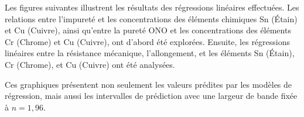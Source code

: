 \documentclass[12pt]{article}
\begin{document}
Les figures suivantes illustrent les résultats des régressions linéaires 
effectuées. Les relations entre l'impureté et les concentrations des 
éléments chimiques Sn (Étain) et Cu (Cuivre), ainsi qu'entre la pureté 
ONO et les concentrations des éléments Cr (Chrome) et Cu (Cuivre), ont 
d'abord été explorées. Ensuite, les régressions linéaires entre la 
résistance mécanique, l'allongement, et les éléments Sn (Étain), Cr 
(Chrome), et Cu (Cuivre) ont été analysées.

Ces graphiques présentent non seulement les valeurs prédites par les 
modèles de régression, mais aussi les intervalles de prédiction avec 
une largeur de bande fixée à $n=1,96$. 



\end{document}
